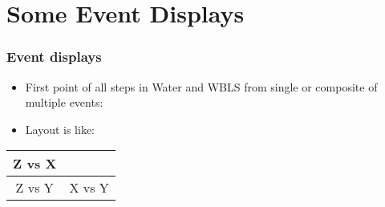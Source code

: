 \documentclass[xcolor=dvipsnames]{beamer}
\begin{document}
\section{Some Event Displays}

\begin{frame}[fragile]
  \frametitle{Event displays}
  \begin{itemize}
  \item First point of all steps in Water and WBLS from single or
    composite of multiple events:
  \item Layout is like:
  \end{itemize}

  \begin{center}
  \begin{tabular}[h]{|c|c|}
    \hline
    Z vs X & \\
    \hline
    Z vs Y & X vs Y \\
    \hline
  \end{tabular}
  \end{center}

\end{frame}


\end{document}
